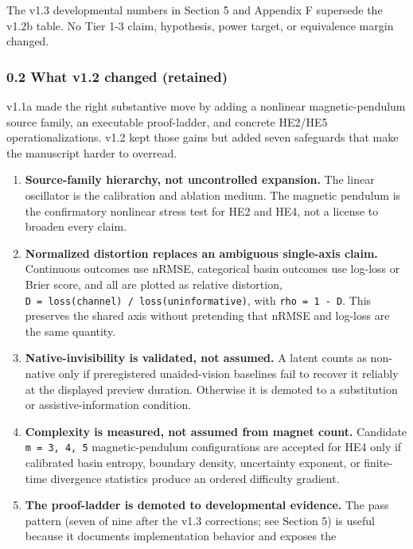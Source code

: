 \documentclass[
  11pt,
]{article}
\providecommand{\tightlist}{%
  \setlength{\itemsep}{0pt}\setlength{\parskip}{0pt}}
\begin{document}
The v1.3 developmental numbers in Section 5 and
Appendix F supersede the v1.2b table. No Tier
1-3 claim, hypothesis, power target, or
equivalence margin changed.

\subsubsection{0.2 What v1.2 changed
(retained)}\label{what-v1.2-changed-retained}

v1.1a made the right substantive move by adding
a nonlinear magnetic-pendulum source family, an
executable proof-ladder, and concrete HE2/HE5
operationalizations. v1.2 kept those gains but
added seven safeguards that make the manuscript
harder to overread.

\begin{enumerate}
\def\labelenumi{\arabic{enumi}.}
\tightlist
\item
  \textbf{Source-family hierarchy, not
  uncontrolled expansion.} The linear oscillator
  is the calibration and ablation medium. The
  magnetic pendulum is the confirmatory
  nonlinear stress test for HE2 and HE4, not a
  license to broaden every claim.
\item
  \textbf{Normalized distortion replaces an
  ambiguous single-axis claim.} Continuous
  outcomes use nRMSE, categorical basin outcomes
  use log-loss or Brier score, and all are
  plotted as relative distortion,
  \texttt{D\ =\ loss(channel)\ /\ loss(uninformative)},
  with \texttt{rho\ =\ 1\ -\ D}. This preserves
  the shared axis without pretending that nRMSE
  and log-loss are the same quantity.
\item
  \textbf{Native-invisibility is validated, not
  assumed.} A latent counts as non-native only
  if preregistered unaided-vision baselines fail
  to recover it reliably at the displayed
  preview duration. Otherwise it is demoted to a
  substitution or assistive-information
  condition.
\item
  \textbf{Complexity is measured, not assumed
  from magnet count.} Candidate
  \texttt{m\ =\ 3,\ 4,\ 5} magnetic-pendulum
  configurations are accepted for HE4 only if
  calibrated basin entropy, boundary density,
  uncertainty exponent, or finite-time
  divergence statistics produce an ordered
  difficulty gradient.
\item
  \textbf{The proof-ladder is demoted to
  developmental evidence.} The pass pattern
  (seven of nine after the v1.3 corrections; see
  Section 5) is useful because it documents
  implementation behavior and exposes the

\end{enumerate}
\end{document}
